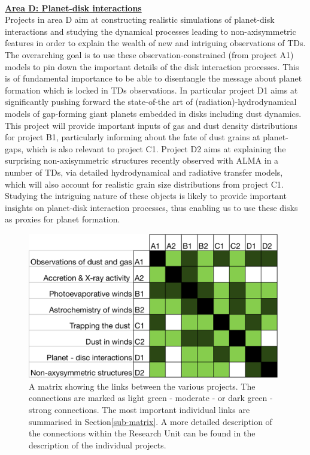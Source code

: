 \documentclass[10pt,fleqn,twoside]{article}
\newcommand{\AreacolD}{\color{Red}}
\begin{document}
\mbox{}\vspace{1em}\\
\noindent\underline{\bf\AreacolD Area D: Planet-disk interactions}\\
\noindent Projects in area D aim at constructing realistic
simulations of planet-disk interactions and studying the dynamical processes
leading to non-axisymmetric features in order to explain the wealth of new
and intriguing observations of TDs. The overarching goal is to use
these observation-constrained (from project A1) models to pin down
the important details of the disk interaction processes. This is of
fundamental importance to be able to disentangle the message about
planet formation which is locked in TDs observations. In particular
project D1 aims at significantly pushing forward the state-of-the art
of (radiation)-hydrodynamical models of gap-forming giant planets
embedded in disks including dust dynamics. 
This project will provide important inputs of
gas and dust density distributions for project B1, particularly informing about the
fate of dust grains at planet-gaps, which is also relevant to project
C1. Project D2 aims at explaining the surprising non-axisymmetric
structures recently observed with ALMA in a number of TDs, via
detailed hydrodynamical and radiative transfer models, which will also
account for realistic grain size distributions from project
C1. Studying the intriguing nature of these objects is likely to
provide important insights on planet-disk interaction processes, thus
enabling us to use these disks as proxies for planet formation.  \\ 


\begin{figure}
\centerline{\includegraphics[width=11cm]{figures/matrix.pdf}}
\caption{\label{fig-matrix} A matrix showing the links between the various
projects. The connections are marked as light green - moderate - or
dark green - strong connections. The most important individual links
are summarised in  Section\ref{sub-matrix}.  A more detailed
description of the connections within the 
Research Unit can be found in the description of the individual
projects.  }
\end{figure}
\end{document}
